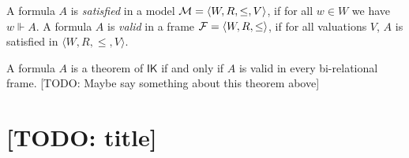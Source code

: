 \documentclass[twoside]{aiml18}
\newcommand{\todo}[1]{{\color{red}[TODO: #1]}}
\newcommand*{\IK}{\mathsf{IK}}
\begin{document}



\begin{definition}
	A formula $A$ is \emph{satisfied} in a model $\mathcal{M} = \langle W, R, \le, V \rangle$, if for all $w \in W$ we have $w \Vdash A$.
%
	A formula $A$ is \emph{valid} in a frame $\mathcal{F} = \langle W, R, \le \rangle$, if for all valuations $V$, $A$ is satisfied in $\langle W, R, \le, V \rangle$.
\end{definition}

%

\begin{theorem}
	A formula $A$ is a theorem of $\IK$ if and only if $A$ is valid in every bi-relational frame.
	\todo{Maybe say something about this theorem above}
\end{theorem}

\section{\todo{title}}
\end{document}
